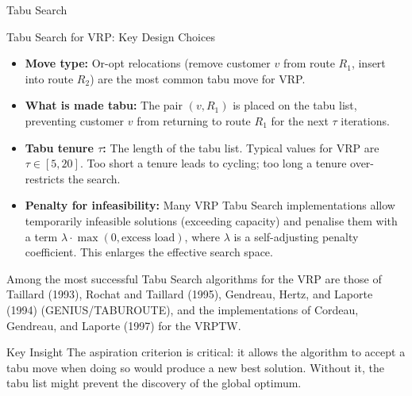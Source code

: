 \documentclass[aspectratio=169,10pt]{beamer}
\begin{document}
\begin{frame}[allowframebreaks]{Tabu Search}
  \begin{block}{Tabu Search for VRP: Key Design Choices}
    \begin{itemize}
      \item \textbf{Move type:} Or-opt relocations (remove customer $v$
            from route $R_1$, insert into route $R_2$) are the most
            common tabu move for VRP.
      \item \textbf{What is made tabu:} The pair $(v, R_1)$ is placed on
            the tabu list, preventing customer $v$ from returning to
            route $R_1$ for the next $\tau$ iterations.
      \item \textbf{Tabu tenure $\tau$:} The length of the tabu list.
            Typical values for VRP are $\tau \in [5, 20]$.  Too short
            a tenure leads to cycling; too long a tenure over-restricts
            the search.
      \item \textbf{Penalty for infeasibility:} Many VRP Tabu Search
            implementations allow temporarily infeasible solutions
            (exceeding capacity) and penalise them with a term
            $\lambda \cdot \max(0, \text{excess load})$, where $\lambda$
            is a self-adjusting penalty coefficient.  This enlarges the
            effective search space.
    \end{itemize}
  \end{block}

  Among the most successful Tabu Search algorithms for the VRP are those
  of Taillard (1993), Rochat and Taillard (1995), Gendreau, Hertz, and
  Laporte (1994) (GENIUS/TABUROUTE), and the implementations of Cordeau,
  Gendreau, and Laporte (1997) for the VRPTW.

  \begin{alertblock}{Key Insight}
    The aspiration criterion is critical: it allows the algorithm to
    accept a tabu move when doing so would produce a new best solution.
    Without it, the tabu list might prevent the discovery of the global
    optimum.
  \end{alertblock}

\end{frame}
\end{document}
